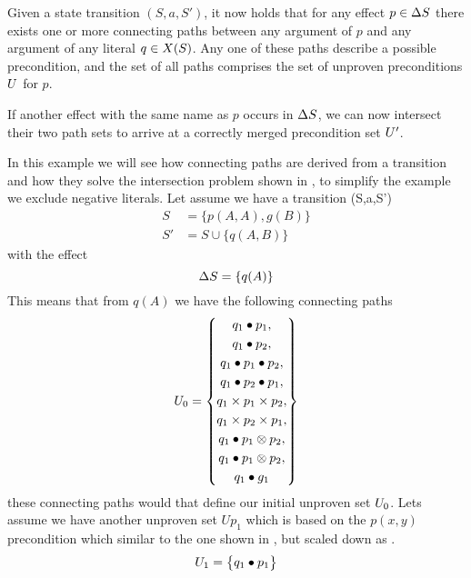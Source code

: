 \documentclass[\master/Master.tex]{subfiles}
\begin{document}
Given a state transition $\left(S, a, S'\right)$, it now holds that for any effect $p \in \Delta S$ there exists one or more connecting paths between any argument of $p$ and any argument of any literal $q \in X(S)$. Any one of these paths describe a possible precondition, and the set of all paths comprises the set of unproven preconditions $U$ for $p$. 

If another effect with the same name as $p$ occurs in $\Delta S$, we can now intersect their two path sets to arrive at a correctly merged precondition set $U'$.

\begin{example}\label{ex:ca:non-binding-interesction-model-fixed}
	In this example we will see how connecting paths are derived from a transition and how they solve the intersection problem shown in , to simplify the example we exclude negative literals.
   Let assume we have a transition (S,a,S')
   \begin{align*}
	   	S &= \{ p(A,A), g(B) \}\\
	   	S'& = S \cup \{ q(A,B) \}
   \end{align*}
   with the effect
	\begin{equation*}
	 	\Delta S = \{ q(A) \}
	\end{equation*}
	This means that from $q(A)$ we have the following connecting paths
	\begin{align*}
		U_0= 
		\left\{
		\begin{gathered}
			q_1 \bullet p_1
		,\\	q_1 \bullet p_2
		,\\	q_1 \bullet p_1 \bullet p_2
		,\\	q_1 \bullet p_2 \bullet p_1
		,\\	q_1 \times p_1 \times p_2 
		,\\	q_1 \times p_2 \times p_1 
		,\\	q_1 \bullet p_1 \otimes p_2 
		,\\	q_1 \bullet p_1 \otimes p_2 
		,\\ q_1 \bullet g_1	
		\end{gathered}	
		\right\}	
	\end{align*}
   these connecting paths would that define our initial unproven set $U_0$.
   Lets assume we have another unproven set $Up_1$ which is based on the $p(x,y)$ precondition which similar to the one shown in , but scaled down as .
   \begin{align*}
   	U_1=
   	\left\{
   	\begin{gathered}
   		 q_1 \bullet p_1 
   	\end{gathered}	
   	\right\}	
   \end{align*}
   

\end{example}
\end{document}
